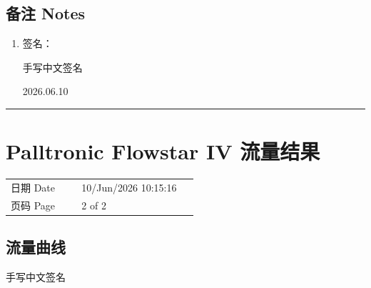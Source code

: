 \documentclass[UTF8,10pt,a4paper,fontset=fandol]{ctexart}
\newcommand{\fieldvalue}[1]{#1}
\newcommand{\handwritten}[1]{#1}
\begin{document}
\subsection*{备注 Notes}

\begin{enumerate}
\item 签名：

\fieldvalue{\handwritten{手写中文签名}}

\fieldvalue{\handwritten{2026.06.10}}
\end{enumerate}

\bigskip
\hrule
\bigskip

\section*{Palltronic Flowstar IV 流量结果}

\begin{tabular}{@{}p{0.34\linewidth}p{0.56\linewidth}@{}}
日期 Date &
\fieldvalue{10/Jun/2026 10:15:16}
\\
页码 Page &
\fieldvalue{2 of 2}
\end{tabular}

\subsection*{流量曲线}

\begin{center}
\end{center}

\fieldvalue{\handwritten{手写中文签名}}
\end{document}
